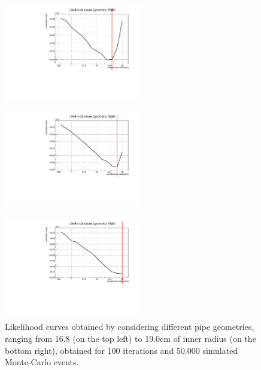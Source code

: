 \documentclass[a4paper, 11pt]{report}
\begin{document}
\begin{figure}[htbp]
\begin{minipage}[b]{.32\textwidth}
\includegraphics[width=6cm, height=4.6cm]{figs/likelihood100HighStat/likelihood18p6.pdf}
\end{minipage}\hfill
\begin{minipage}[b]{.32\textwidth}
\includegraphics[width=6cm, height=4.6cm]{figs/likelihood100HighStat/likelihood18p8.pdf}
\end{minipage} \hfill
\begin{minipage}[b]{.32\textwidth}
\includegraphics[width=6cm, height=4.6cm]{figs/likelihood100HighStat/likelihood19p0.pdf}
\end{minipage} \hfill
\caption{Likelihood curves obtained by considering different pipe geometries, ranging from 16.8 (on the top left) to 19.0cm of inner radius (on the bottom right), obtained for 100 iterations and 50.000 simulated Monte-Carlo events.}
\label{fig:likelihoods2}
\end{figure}
\end{document}
